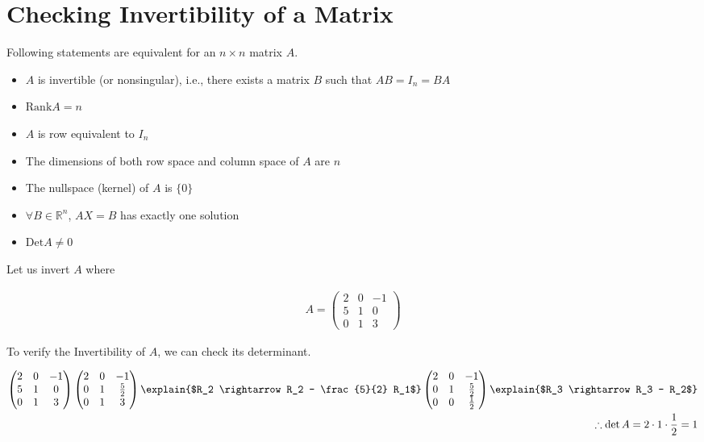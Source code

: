

\section{Checking Invertibility of a Matrix}

Following statements are equivalent for an $n \times n$ matrix $A$.

\begin{itemize}
  \item $A$ is invertible (or nonsingular), i.e., there exists a matrix $B$ such that $AB = I_n = BA$
  \item $\mathrm{Rank} A = n$
  \item $A$ is row equivalent to $I_n$
  \item The dimensions of both row space and column space of $A$ are $n$
  \item The nullspace (kernel) of $A$ is $\{0\}$
  \item $\forall B \in \mathbb{R}^n$, $AX = B$ has exactly one solution
  \item $\mathrm{Det} A \neq 0$
\end{itemize}

Let us invert $A$ where

\begin{align*}
  A =
  \begin{pmatrix}
    2 & 0 & -1\\
    5 & 1 &  0 \\
    0 & 1 &  3
  \end{pmatrix}
\end{align*}

To verify the Invertibility of $A$, we can check its determinant.

\begin{align*}
  \begin{pmatrix}
    2 & 0 & -1\\
    5 & 1 &  0 \\
    0 & 1 &  3
  \end{pmatrix}
  \begin{pmatrix}
    2 & 0 &           -1\\
    0 & 1 & \frac{5}{2} \\
    0 & 1 &           3
  \end{pmatrix}
  \explain{$R_2 \rightarrow R_2 - \frac{5}{2} R_1$}
  \begin{pmatrix}
    2 & 0 &           -1\\
    0 & 1 & \frac{5}{2} \\
    0 & 0 & \frac{1}{2}
  \end{pmatrix}
  \explain{$R_3 \rightarrow R_3 - R_2$}\\
  \therefore \det A = 2 \cdot 1 \cdot \frac{1}{2} = 1
\end{align*}

